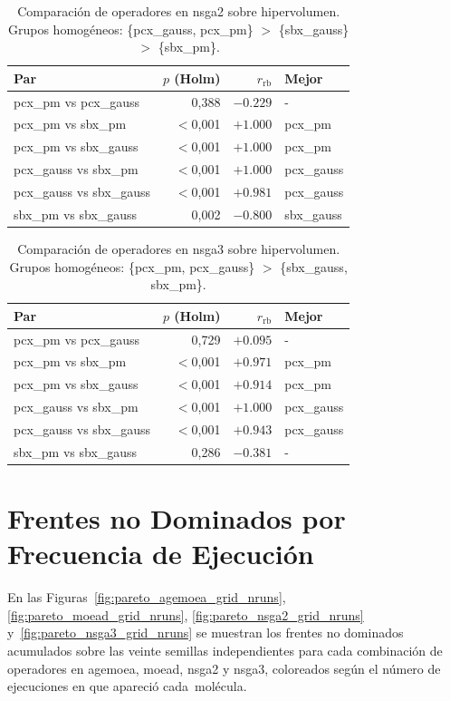 \begin{table}[H]
\centering
\caption{Comparación de operadores en \acrshort{nsga2} sobre hipervolumen. Grupos homogéneos: \{pcx\_gauss, pcx\_pm\} $>$ \{sbx\_gauss\} $>$ \{sbx\_pm\}.}
\label{tab:ops_nsga2}
\begin{tabular}{lrrl}
\toprule
Par & $p$ (Holm) & $r_{\text{rb}}$ & Mejor \\
\midrule
pcx\_pm vs pcx\_gauss & 0,388 & $-0.229$ & - \\
pcx\_pm vs sbx\_pm & $<$0,001 & $+1.000$ & pcx\_pm \\
pcx\_pm vs sbx\_gauss & $<$0,001 & $+1.000$ & pcx\_pm \\
pcx\_gauss vs sbx\_pm & $<$0,001 & $+1.000$ & pcx\_gauss \\
pcx\_gauss vs sbx\_gauss & $<$0,001 & $+0.981$ & pcx\_gauss \\
sbx\_pm vs sbx\_gauss & 0,002 & $-0.800$ & sbx\_gauss \\
\bottomrule
\end{tabular}
\end{table}

\begin{table}[H]
\centering
\caption{Comparación de operadores en \acrshort{nsga3} sobre hipervolumen. Grupos homogéneos: \{pcx\_pm, pcx\_gauss\} $>$ \{sbx\_gauss, sbx\_pm\}.}
\label{tab:ops_nsga3}
\begin{tabular}{lrrl}
\toprule
Par & $p$ (Holm) & $r_{\text{rb}}$ & Mejor \\
\midrule
pcx\_pm vs pcx\_gauss & 0,729 & $+0.095$ & - \\
pcx\_pm vs sbx\_pm & $<$0,001 & $+0.971$ & pcx\_pm \\
pcx\_pm vs sbx\_gauss & $<$0,001 & $+0.914$ & pcx\_pm \\
pcx\_gauss vs sbx\_pm & $<$0,001 & $+1.000$ & pcx\_gauss \\
pcx\_gauss vs sbx\_gauss & $<$0,001 & $+0.943$ & pcx\_gauss \\
sbx\_pm vs sbx\_gauss & 0,286 & $-0.381$ & - \\
\bottomrule
\end{tabular}
\end{table}

\clearpage
\section{Frentes no Dominados por Frecuencia de Ejecución}
\label{sec:apendice_frentes_nruns}

En las Figuras~\ref{fig:pareto_agemoea_grid_nruns}, \ref{fig:pareto_moead_grid_nruns}, \ref{fig:pareto_nsga2_grid_nruns} y~\ref{fig:pareto_nsga3_grid_nruns} se muestran los frentes no dominados acumulados sobre las veinte semillas independientes para cada combinación de operadores en \acrshort{agemoea}, \acrshort{moead}, \acrshort{nsga2} y \acrshort{nsga3}, coloreados según el número de ejecuciones en que apareció cada~molécula.

